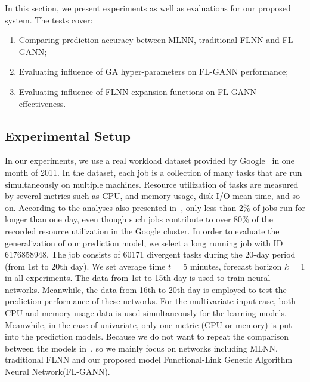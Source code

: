 \documentclass[conference]{IEEEtran}
\begin{document}
In this section, we present experiments as well as evaluations for our proposed system. The tests cover: 
\begin{enumerate}
	\item Comparing prediction accuracy between MLNN, traditional FLNN and FL-GANN;
	\item Evaluating influence of GA hyper-parameters on FL-GANN performance;
	\item Evaluating influence of FLNN expansion functions on FL-GANN effectiveness. 
\end{enumerate}

\subsection{Experimental Setup}
\label{experimental_setup}

In our experiments, we use a real workload dataset provided by Google~\cite{ref_google_trace} in one month of 2011. In the dataset, each job is a collection of many tasks that are run simultaneously on multiple machines. Resource utilization of tasks are measured by several metrics such as CPU, and memory usage, disk I/O mean time, and so on. According to the analyses also presented in~\cite{ref_google_trace}, only less than 2$\%$ of jobs run for longer than one day, even though such jobs contribute to over 80$\%$ of the recorded resource utilization in the Google cluster. In order to evaluate the generalization of our prediction model, we select a long running job with ID 6176858948. The job consists of 60171 divergent tasks during the 20-day period (from 1st to 20th day). We set average time $t$ = 5 minutes, forecast horizon $k$ = 1 in all experiments. The data from 1st to 15th day is used to train neural networks. Meanwhile, the data from 16th to 20th day is employed to test the prediction performance of these networks. For the multivariate input case, both CPU and memory usage data is used simultaneously for the learning models. Meanwhile, in the case of univariate, only one metric (CPU or memory) is put into the prediction models. Because we do not want to repeat the comparison between the models in~\cite{ref_hipel}, so we mainly focus on networks including MLNN, traditional FLNN and our proposed model Functional-Link Genetic Algorithm Neural Network(FL-GANN).
\end{document}
